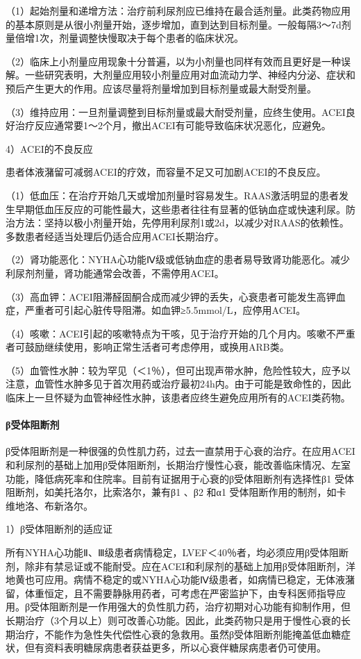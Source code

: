 （1）起始剂量和递增方法：治疗前利尿剂应已维持在最合适剂量。此类药物应用的基本原则是从很小剂量开始，逐步增加，直到达到目标剂量。一般每隔3～7d剂量倍增1次，剂量调整快慢取决于每个患者的临床状况。

（2）临床上小剂量应用现象十分普遍，以为小剂量也同样有效而且更好是一种误解。一些研究表明，大剂量应用较小剂量应用对血流动力学、神经内分泌、症状和预后产生更大的作用。应该尽量将剂量增加到目标剂量或最大耐受剂量。

（3）维持应用：一旦剂量调整到目标剂量或最大耐受剂量，应终生使用。ACEI良好治疗反应通常要1～2个月，撤出ACEI有可能导致临床状况恶化，应避免。

4）ACEI的不良反应

患者体液潴留可减弱ACEI的疗效，而容量不足又可加剧ACEI的不良反应。

（1）低血压：在治疗开始几天或增加剂量时容易发生。RAAS激活明显的患者发生早期低血压反应的可能性最大，这些患者往往有显著的低钠血症或快速利尿。防治方法：坚持以极小剂量开始，先停用利尿剂1或2d，以减少对RAAS的依赖性。多数患者经适当处理后仍适合应用ACEI长期治疗。

（2）肾功能恶化：NYHA心功能Ⅳ级或低钠血症的患者易导致肾功能恶化。减少利尿剂剂量，肾功能通常会改善，不需停用ACEI。

（3）高血钾：ACEI阻滞醛固酮合成而减少钾的丢失，心衰患者可能发生高钾血症，严重者可引起心脏传导阻滞。如血钾≥5.5mmol/L，应停用ACEI。

（4）咳嗽：ACEI引起的咳嗽特点为干咳，见于治疗开始的几个月内。咳嗽不严重者可鼓励继续使用，影响正常生活者可考虑停用，或换用ARB类。

（5）血管性水肿：较为罕见（＜1％），但可出现声带水肿，危险性较大，应予以注意，血管性水肿多见于首次用药或治疗最初24h内。由于可能是致命性的，因此临床上一旦怀疑为血管神经性水肿，该患者应终生避免应用所有的ACEI类药物。
\paragraph{β受体阻断剂}

β受体阻断剂是一种很强的负性肌力药，过去一直禁用于心衰的治疗。在应用ACEI和利尿剂的基础上加用β受体阻断剂，长期治疗慢性心衰，能改善临床情况、左室功能，降低病死率和住院率。目前有证据用于心衰的β受体阻断剂有选择性β{1}
受体阻断剂，如美托洛尔，比索洛尔，兼有β{1} 、β{2} 和α{1}
受体阻断作用的制剂，如卡维地洛、布新洛尔。

1）β受体阻断剂的适应证

所有NYHA心功能Ⅱ、Ⅲ级患者病情稳定，LVEF＜40％者，均必须应用β受体阻断剂，除非有禁忌证或不能耐受。应在ACEI和利尿剂的基础上加用β受体阻断剂，洋地黄也可应用。病情不稳定的或NYHA心功能Ⅳ级患者，如病情已稳定，无体液潴留，体重恒定，且不需要静脉用药者，可考虑在严密监护下，由专科医师指导应用。β受体阻断剂是一作用强大的负性肌力药，治疗初期对心功能有抑制作用，但长期治疗（3个月以上）则可改善心功能。因此，此类药物只是用于慢性心衰的长期治疗，不能作为急性失代偿性心衰的急救用。虽然β受体阻断剂能掩盖低血糖症状，但有资料表明糖尿病患者获益更多，所以心衰伴糖尿病患者仍可使用。

